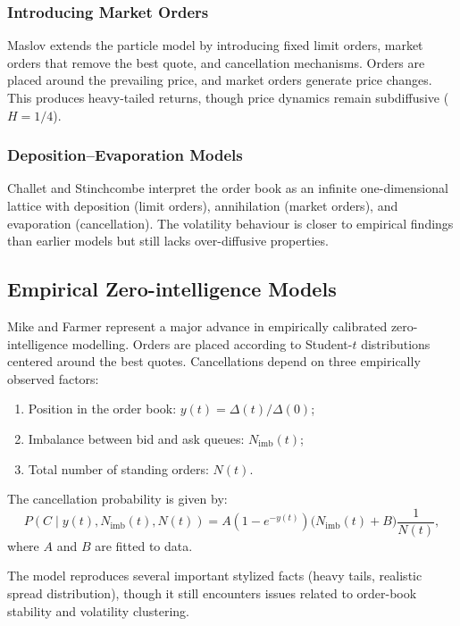 \subsubsection{Introducing Market Orders}
Maslov \cite{maslov2000} extends the particle model by introducing fixed limit orders, market
orders that remove the best quote, and cancellation mechanisms. Orders are placed around
the prevailing price, and market orders generate price changes. This produces heavy-tailed
returns, though price dynamics remain subdiffusive ($H=1/4$).

\subsubsection{Deposition--Evaporation Models}
Challet and Stinchcombe \cite{challet2001} interpret the order book as an infinite one-dimensional
lattice with deposition (limit orders), annihilation (market orders), and evaporation 
(cancellation). The volatility behaviour is closer to empirical findings than earlier models
but still lacks over-diffusive properties.

\subsection{Empirical Zero-intelligence Models}

Mike and Farmer \cite{mikefarmer2008} represent a major advance in empirically calibrated
zero-intelligence modelling. Orders are placed according to Student-\(t\) distributions centered
around the best quotes. Cancellations depend on three empirically observed factors:
\begin{enumerate}
    \item Position in the order book: \(y(t) = \Delta(t)/\Delta(0)\);
    \item Imbalance between bid and ask queues: \(N_{\mathrm{imb}}(t)\);
    \item Total number of standing orders: \(N(t)\).
\end{enumerate}

The cancellation probability is given by:
\begin{equation}
P(C \mid y(t), N_{\mathrm{imb}}(t), N(t))
= 
A (1 - e^{-y(t)})
\bigl(N_{\mathrm{imb}}(t) + B \bigr)
\frac{1}{N(t)},
\label{eq:mike_farmer_cancellation}
\end{equation}
where \(A\) and \(B\) are fitted to data.

The model reproduces several important stylized facts (heavy tails, realistic spread
distribution), though it still encounters issues related to order-book stability and volatility
clustering.

